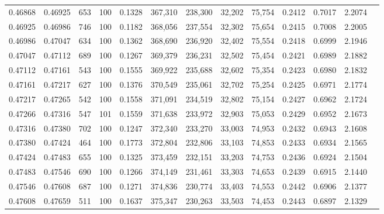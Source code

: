 \begin{tabular}{rrrrrrrrrrrrr}
0.46868 & 0.46925 &   653 & 100 &                                     0.1328 & 367,310 & 238,300 &  32,202 &  75,754 & 0.2412 & 0.7017 & 2.2074 \\
0.46925 & 0.46986 &   746 & 100 &                                     0.1182 & 368,056 & 237,554 &  32,302 &  75,654 & 0.2415 & 0.7008 & 2.2005 \\
0.46986 & 0.47047 &   634 & 100 &                                     0.1362 & 368,690 & 236,920 &  32,402 &  75,554 & 0.2418 & 0.6999 & 2.1946 \\
0.47047 & 0.47112 &   689 & 100 &                                     0.1267 & 369,379 & 236,231 &  32,502 &  75,454 & 0.2421 & 0.6989 & 2.1882 \\
0.47112 & 0.47161 &   543 & 100 &                                     0.1555 & 369,922 & 235,688 &  32,602 &  75,354 & 0.2423 & 0.6980 & 2.1832 \\
0.47161 & 0.47217 &   627 & 100 &                                     0.1376 & 370,549 & 235,061 &  32,702 &  75,254 & 0.2425 & 0.6971 & 2.1774 \\
0.47217 & 0.47265 &   542 & 100 &                                     0.1558 & 371,091 & 234,519 &  32,802 &  75,154 & 0.2427 & 0.6962 & 2.1724 \\
0.47266 & 0.47316 &   547 & 101 &                                     0.1559 & 371,638 & 233,972 &  32,903 &  75,053 & 0.2429 & 0.6952 & 2.1673 \\
0.47316 & 0.47380 &   702 & 100 &                                     0.1247 & 372,340 & 233,270 &  33,003 &  74,953 & 0.2432 & 0.6943 & 2.1608 \\
0.47380 & 0.47424 &   464 & 100 &                                     0.1773 & 372,804 & 232,806 &  33,103 &  74,853 & 0.2433 & 0.6934 & 2.1565 \\
0.47424 & 0.47483 &   655 & 100 &                                     0.1325 & 373,459 & 232,151 &  33,203 &  74,753 & 0.2436 & 0.6924 & 2.1504 \\
0.47483 & 0.47546 &   690 & 100 &                                     0.1266 & 374,149 & 231,461 &  33,303 &  74,653 & 0.2439 & 0.6915 & 2.1440 \\
0.47546 & 0.47608 &   687 & 100 &                                     0.1271 & 374,836 & 230,774 &  33,403 &  74,553 & 0.2442 & 0.6906 & 2.1377 \\
0.47608 & 0.47659 &   511 & 100 &                                     0.1637 & 375,347 & 230,263 &  33,503 &  74,453 & 0.2443 & 0.6897 & 2.1329 \\

\end{tabular}
